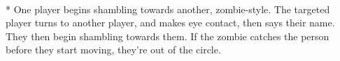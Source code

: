 \begin{minipage}{\textwidth}
\equip{}
\\*
One player begins shambling towards another, zombie-style.  The targeted player turns to another player, and makes eye contact, then says their name.  They then begin shambling towards them.  If the zombie catches the person before they start moving, they're out of the circle.
\end{minipage}    \vfill
